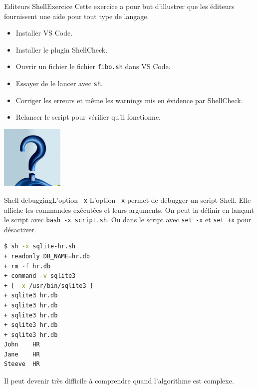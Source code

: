 \documentclass{beamer}
\begin{document}
    \begin{frame}{Editeurs Shell}{Exercice \execcounterdispinc}
        Cette exercice a pour but d'illustrer que les éditeurs fournissent une aide pour tout type de langage.
        \begin{itemize}
            \item Installer VS Code.
            \item Installer le plugin ShellCheck.
            \item Ouvrir un fichier le fichier \lstinline{fibo.sh} dans VS Code.
            \item Essayer de le lancer avec \lstinline{sh}.
            \item Corriger les erreurs et même les warnings mis en évidence par ShellCheck.
            \item Relancer le script pour vérifier qu'il fonctionne.
        \end{itemize}
        \bigbreak
        \centering
        \includegraphics[width=3cm]{image/question-mark-on-a-blank-background}
    \end{frame}

    \begin{frame}[fragile]{Shell debugging}{L'option \lstinline{-x}}
        L'option \lstinline{-x} permet de débugger un script Shell.
        Elle affiche les commandes exécutées et leurs arguments.
        On peut la définir en lançant le script avec \lstinline{bash -x script.sh}.
        Ou dans le script avec \lstinline{set -x} et \lstinline{set +x} pour désactiver.
        \bigbreak
        \begin{lstlisting}[language=bash]
$ sh -x sqlite-hr.sh
+ readonly DB_NAME=hr.db
+ rm -f hr.db
+ command -v sqlite3
+ [ -x /usr/bin/sqlite3 ]
+ sqlite3 hr.db
+ sqlite3 hr.db
+ sqlite3 hr.db
+ sqlite3 hr.db
+ sqlite3 hr.db
John    HR
Jane    HR
Steeve  HR
        \end{lstlisting}
        \bigbreak
        Il peut devenir très difficile à comprendre quand l'algorithme est complexe.
    \end{frame}
\end{document}
